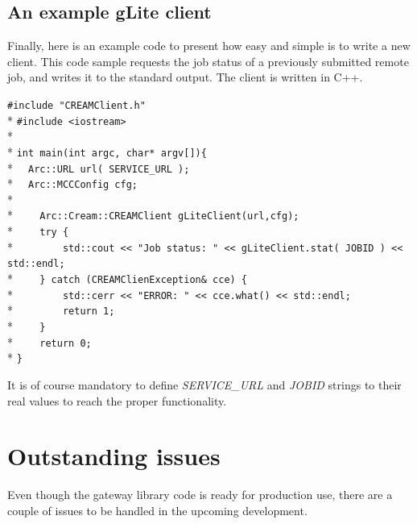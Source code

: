\documentclass{article}
\begin{document}
\subsection{An example gLite client}
Finally, here is an example code to present how easy and simple is to write a new client. This code sample requests the job status of a previously submitted remote job, and writes it to the standard output. The client is written in C++.
\begin{framed}
\verb?#include "CREAMClient.h"?\\*
\verb?#include <iostream>?\\*
\\*
\verb?int main(int argc, char* argv[]){?\\*
\verb?  Arc::URL url( SERVICE_URL );?\\*
\verb?  Arc::MCCConfig cfg;?\\*
\\*
\verb?    Arc::Cream::CREAMClient gLiteClient(url,cfg);?\\*
\verb?    try {?\\*
\verb?        std::cout << "Job status: " << gLiteClient.stat( JOBID ) << std::endl;?\\*
\verb?    } catch (CREAMClienException& cce) {?\\*
\verb?        std::cerr << "ERROR: " << cce.what() << std::endl;?\\*
\verb?        return 1;?\\*
\verb?    }?\\*
\verb?    return 0;?\\*
\verb?}?
\end{framed}
It is of course mandatory to define \textit{SERVICE\_URL} and \textit{JOBID} strings to their real values to reach the proper functionality.
\section{Outstanding issues}
\label{Outstanding issues}
Even though the gateway library code is ready for production use, there are a couple of issues to be handled in the upcoming development.
\end{document}
